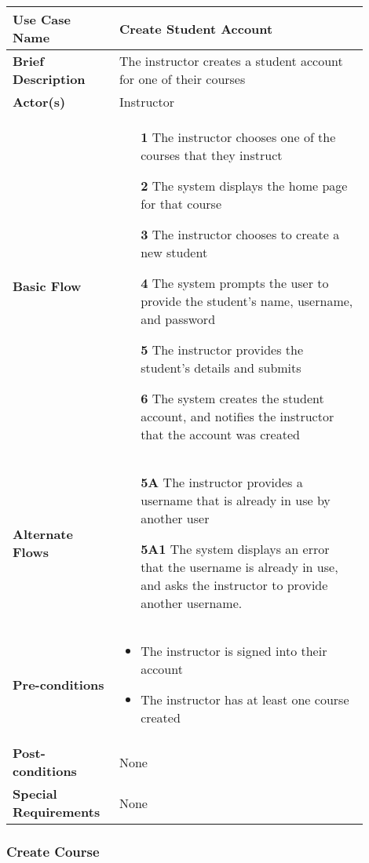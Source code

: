 \documentclass{article}
\begin{document}
\begin{tabular}{| p{0.25\linewidth} | p{0.65\linewidth} |}
  \hline
  \textbf{Use Case Name} & Create Student Account \\
  \hline
  \textbf{Brief Description} & The instructor creates a student account for one of their courses \\
  \hline
  \textbf{Actor(s)} & Instructor \\
  \hline
  \textbf{Basic Flow} & \begin{itemize}
    \item[\textbf{1}] The instructor chooses one of the courses that they instruct
    \item[\textbf{2}] The system displays the home page for that course
    \item[\textbf{3}] The instructor chooses to create a new student
    \item[\textbf{4}] The system prompts the user to provide the student's name, username, and password
    \item[\textbf{5}] The instructor provides the student's details and submits
    \item[\textbf{6}] The system creates the student account, and notifies the instructor that the account was created
  \end{itemize}\\
  \hline
  \textbf{Alternate Flows} & \begin{itemize}
    \item[\textbf{5A}] The instructor provides a username that is already in use by another user
    \item[\textbf{5A1}] The system displays an error that the username is already in use, and asks the instructor to provide another username.
  \end{itemize} \\
  \hline
  \textbf{Pre-conditions} & \begin{itemize}
    \item The instructor is signed into their account
    \item The instructor has at least one course created
  \end{itemize} \\
  \hline
  \textbf{Post-conditions} & None \\
  \hline
  \textbf{Special Requirements} & None \\
  \hline
\end{tabular}


\subsubsection{Create Course}
\end{document}
